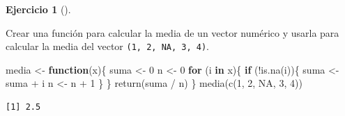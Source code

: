 \documentclass[
  a4paper,
]{scrreport}
\newenvironment{Shaded}{\begin{snugshade}}{\end{snugshade}}
\newcommand{\ConstantTok}[1]{\textcolor[rgb]{0.56,0.35,0.01}{#1}}
\newcommand{\ControlFlowTok}[1]{\textcolor[rgb]{0.00,0.23,0.31}{\textbf{#1}}}
\newcommand{\DecValTok}[1]{\textcolor[rgb]{0.68,0.00,0.00}{#1}}
\newcommand{\FunctionTok}[1]{\textcolor[rgb]{0.28,0.35,0.67}{#1}}
\newcommand{\NormalTok}[1]{\textcolor[rgb]{0.00,0.23,0.31}{#1}}
\newcommand{\OtherTok}[1]{\textcolor[rgb]{0.00,0.23,0.31}{#1}}
\newcommand{\SpecialCharTok}[1]{\textcolor[rgb]{0.37,0.37,0.37}{#1}}
\theoremstyle{definition}
\newtheorem{exercise}{Ejercicio}[chapter]
\theoremstyle{definition}
\theoremstyle{remark}
\begin{document}
\begin{exercise}[]\protect\hypertarget{exr-funciones-1}{}\label{exr-funciones-1}

Crear una función para calcular la media de un vector numérico y usarla
para calcular la media del vector \texttt{(1,\ 2,\ NA,\ 3,\ 4)}.

\begin{tcolorbox}[enhanced jigsaw, title=\textcolor{quarto-callout-note-color}{\faInfo}\hspace{0.5em}{Solución}, titlerule=0mm, toprule=.15mm, colbacktitle=quarto-callout-note-color!10!white, arc=.35mm, colframe=quarto-callout-note-color-frame, opacitybacktitle=0.6, coltitle=black, left=2mm, colback=white, opacityback=0, breakable, bottomrule=.15mm, toptitle=1mm, leftrule=.75mm, bottomtitle=1mm, rightrule=.15mm]

\begin{Shaded}
\begin{Highlighting}[]
\NormalTok{media }\OtherTok{\textless{}{-}} \ControlFlowTok{function}\NormalTok{(x)\{}
\NormalTok{  suma }\OtherTok{\textless{}{-}} \DecValTok{0}
\NormalTok{  n }\OtherTok{\textless{}{-}} \DecValTok{0}
  \ControlFlowTok{for}\NormalTok{ (i }\ControlFlowTok{in}\NormalTok{ x)\{}
    \ControlFlowTok{if}\NormalTok{ (}\SpecialCharTok{!}\FunctionTok{is.na}\NormalTok{(i))\{}
\NormalTok{      suma }\OtherTok{\textless{}{-}}\NormalTok{ suma }\SpecialCharTok{+}\NormalTok{ i}
\NormalTok{      n }\OtherTok{\textless{}{-}}\NormalTok{ n }\SpecialCharTok{+} \DecValTok{1}
\NormalTok{    \}}
\NormalTok{  \}}
  \FunctionTok{return}\NormalTok{(suma }\SpecialCharTok{/}\NormalTok{ n)}
\NormalTok{\}}
\FunctionTok{media}\NormalTok{(}\FunctionTok{c}\NormalTok{(}\DecValTok{1}\NormalTok{, }\DecValTok{2}\NormalTok{, }\ConstantTok{NA}\NormalTok{, }\DecValTok{3}\NormalTok{, }\DecValTok{4}\NormalTok{))}
\end{Highlighting}
\end{Shaded}

\begin{verbatim}
[1] 2.5
\end{verbatim}

\end{tcolorbox}

\end{exercise}
\end{document}
